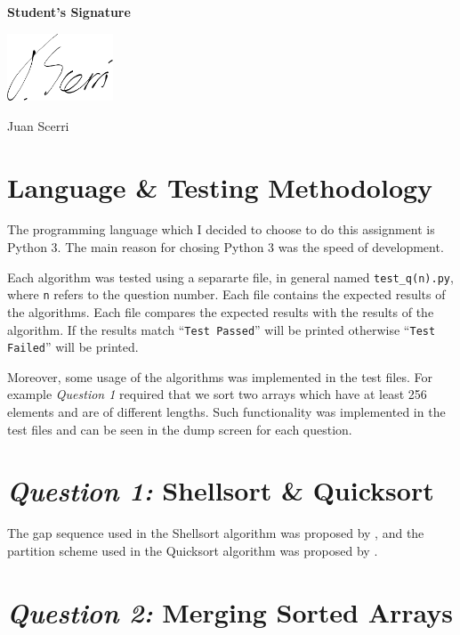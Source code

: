 \documentclass[12pt]{article}
\begin{document}
\vfill

\textbf{Student's Signature} \medskip

\underline{\includegraphics[height=2cm]{sig}} \medskip

Juan Scerri

\section{Language \& Testing Methodology}

The programming language which I decided to choose to do this
assignment is Python 3. The main reason for chosing Python 3 was
the speed of development.

Each algorithm was tested using a separarte file, in general
named \texttt{test\_q(n).py}, where \texttt{n} refers to the
question number. Each file contains the expected results of the
algorithms. Each file compares the expected results with the
results of the algorithm. If the results match ``\texttt{Test
Passed}'' will be printed otherwise ``\texttt{Test Failed}''
will be printed. 

Moreover, some usage of the algorithms was implemented in the
test files. For example \textit{Question 1} required that we
sort two arrays which have at least 256 elements and are of
different lengths. Such functionality was implemented in the
test files and can be seen in the dump screen for each question.

\section{\textit{Question 1:} Shellsort \& Quicksort}

The gap sequence used in the Shellsort algorithm was proposed by
\textcite{frank60}, and the partition scheme used in the
Quicksort algorithm was proposed by \textcite{hoare62}.







\section{\textit{Question 2:} Merging Sorted Arrays}
\end{document}
